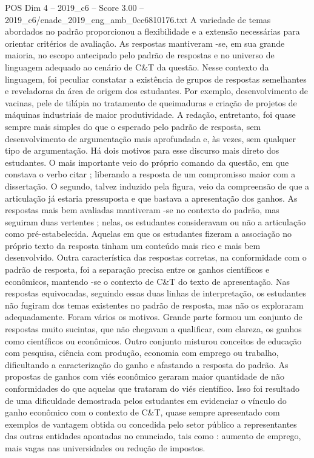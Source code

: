 \begin{textsample}{POS Dim 4 – 2019\_c6 – Score 3.00 – 2019\_c6/enade\_2019\_eng\_amb\_0cc6810176.txt}
A variedade de temas abordados no padrão proporcionou a flexibilidade e a extensão necessárias para orientar critérios de avaliação.
As respostas mantiveram -se, em sua grande maioria, no escopo antecipado pelo padrão de respostas e no universo de linguagem adequado ao cenário de C\&T da questão.
Nesse contexto da linguagem, foi peculiar constatar a existência de grupos de respostas semelhantes e reveladoras da área de origem dos estudantes.
Por exemplo, desenvolvimento de vacinas, pele de tilápia no tratamento de queimaduras e criação de projetos de máquinas industriais de maior produtividade.
A redação, entretanto, foi quase sempre mais simples do que o esperado pelo padrão de resposta, sem desenvolvimento de argumentação mais aprofundada e, às vezes, sem qualquer tipo de argumentação.
Há dois motivos para esse discurso mais direto dos estudantes.
O mais importante veio do próprio comando da questão, em que constava o verbo citar ; liberando a resposta de um compromisso maior com a dissertação.
O segundo, talvez induzido pela figura, veio da compreensão de que a articulação já estaria pressuposta e que bastava a apresentação dos ganhos.
As respostas mais bem avaliadas mantiveram -se no contexto do padrão, mas seguiram duas vertentes ; nelas, os estudantes consideravam ou não a articulação como pré-estabelecida.
Aquelas em que os estudantes fizeram a associação no próprio texto da resposta tinham um conteúdo mais rico e mais bem desenvolvido.
Outra característica das respostas corretas, na conformidade com o padrão de resposta, foi a separação precisa entre os ganhos científicos e econômicos, mantendo -se o contexto de C\&T do texto de apresentação.
Nas respostas equivocadas, seguindo essas duas linhas de interpretação, os estudantes não fugiram dos temas existentes no padrão de resposta, mas não os exploraram adequadamente.
Foram vários os motivos.
Grande parte formou um conjunto de respostas muito sucintas, que não chegavam a qualificar, com clareza, os ganhos como científicos ou econômicos.
Outro conjunto misturou conceitos de educação com pesquisa, ciência com produção, economia com emprego ou trabalho, dificultando a caracterização do ganho e afastando a resposta do padrão.
As propostas de ganhos com viés econômico geraram maior quantidade de não conformidades do que aquelas que trataram do viés científico.
Isso foi resultado de uma dificuldade demostrada pelos estudantes em evidenciar o vínculo do ganho econômico com o contexto de C\&T, quase sempre apresentado com exemplos de vantagem obtida ou concedida pelo setor público a representantes das outras entidades apontadas no enunciado, tais como : aumento de emprego, mais vagas nas universidades ou redução de impostos.

\end{textsample}
